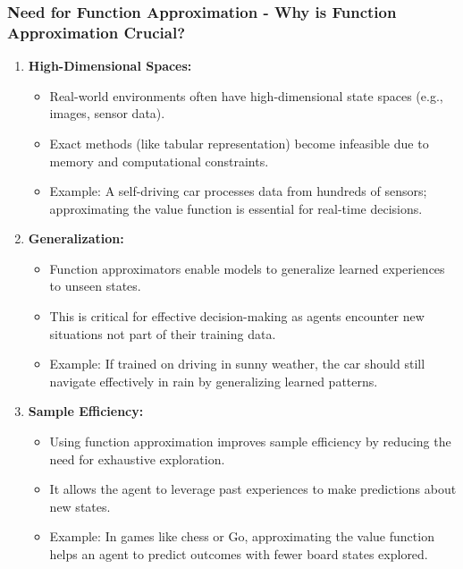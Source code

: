 \documentclass[aspectratio=169]{beamer}
\begin{document}
\begin{frame}[fragile]
    \frametitle{Need for Function Approximation - Why is Function Approximation Crucial?}
    \begin{enumerate}
        \item \textbf{High-Dimensional Spaces:}
        \begin{itemize}
            \item Real-world environments often have high-dimensional state spaces (e.g., images, sensor data).
            \item Exact methods (like tabular representation) become infeasible due to memory and computational constraints.
            \item Example: A self-driving car processes data from hundreds of sensors; approximating the value function is essential for real-time decisions.
        \end{itemize}
        
        \item \textbf{Generalization:}
        \begin{itemize}
            \item Function approximators enable models to generalize learned experiences to unseen states.
            \item This is critical for effective decision-making as agents encounter new situations not part of their training data.
            \item Example: If trained on driving in sunny weather, the car should still navigate effectively in rain by generalizing learned patterns.
        \end{itemize}
        
        \item \textbf{Sample Efficiency:}
        \begin{itemize}
            \item Using function approximation improves sample efficiency by reducing the need for exhaustive exploration.
            \item It allows the agent to leverage past experiences to make predictions about new states.
            \item Example: In games like chess or Go, approximating the value function helps an agent to predict outcomes with fewer board states explored.
        \end{itemize}
    \end{enumerate}
\end{frame}
\end{document}

